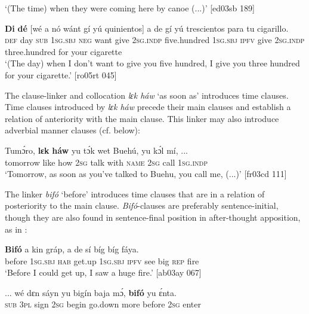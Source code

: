 \glt ‘(The time) when they were coming here by canoe (...)’ [ed03sb 189]
\z


\ea%
    \label{ex:key:1474}
    \gll \textbf{Di}  \textbf{dé}  [wé  a    nó  wánt  gí  yú    quinientos]
a    de  gí  yú    trescientos    para    tu    cigarillo.\\
\textsc{def}  day   \phantom{[}\textsc{sub}  \textsc{1sg.sbj}  \textsc{neg}  want  give  \textsc{2sg.indp}  five.hundred
\textsc{1sg.sbj}  \textsc{ipfv}  give  \textsc{2sg.indp}  three.hundred  for    your  cigarette\\

\glt ‘(The day) when I don’t want to give you five hundred, I give you 
three hundred for your cigarette.’ [ro05rt 045]
\z

The clause-linker and collocation\textit{ lɛk háw} ‘as soon as’ introduces time clauses. Time clauses introduced by \textit{lɛk háw} precede their main clauses and establish a relation of anteriority with the main clause. This linker may also introduce adverbial manner clauses (cf.  below): 


\ea%
    \label{ex:key:1475}
    \gll Tumɔ́ro,    \textbf{lɛk}  \textbf{háw}    yu  tɔ́k  wet    Buehú,  yu  kɔ́l  mí,    \op...\cp{}\\
tomorrow  like  how    \textsc{2sg}  talk  with    \textsc{name}  \textsc{2sg}  call  \textsc{1sg.indp}\\

\glt ‘Tomorrow, as soon as you’ve talked to Buehu, you call me, (...)’ [fr03cd 111]
\z

The linker \textit{bifó} ‘before’ introduces time clauses that are in a relation of posteriority to the main clause. \textit{Bifó}{}-clauses are preferably sentence-initial, though they are also found in sentence-final position in after-thought apposition, as in : 


\ea%
    \label{ex:key:1476}
    \gll \textbf{Bifó}    a    kin  gráp,  a    de  sí  bíg  bíg  fáya.\\
before  \textsc{1sg.sbj}  \textsc{hab}  get.up  \textsc{1sg.sbj}  \textsc{ipfv}  see  big  \textsc{rep}  fire\\

\glt ‘Before I could get up, I saw a huge fire.’ [ab03ay 067]
\z


\ea%
    \label{ex:key:1477}
    \gll \op...\cp{}  wé  dɛn  sáyn  yu  bigín  baja    mɔ́,    \textbf{bifó}    yu  ɛ́nta.\\
  \textsc{sub}  \textsc{3pl}  sign    \textsc{2sg}  begin  go.down  more  before  \textsc{2sg}  enter\\

